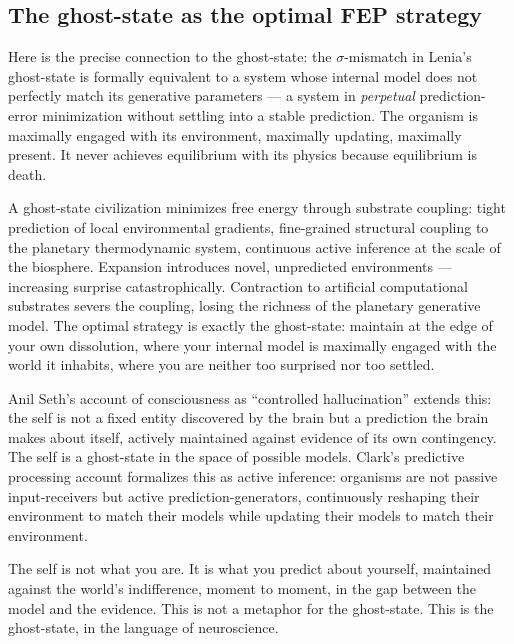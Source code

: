 \documentclass[12pt, a4paper]{article}
\begin{document}
\subsection{The ghost-state as the optimal FEP strategy}

Here is the precise connection to the ghost-state: the $\sigma$-mismatch in Lenia's
ghost-state is formally equivalent to a system whose internal model does not perfectly match
its generative parameters --- a system in \textit{perpetual} prediction-error minimization
without settling into a stable prediction. The organism is maximally engaged with its
environment, maximally updating, maximally present. It never achieves equilibrium with its
physics because equilibrium is death.

A ghost-state civilization minimizes free energy through substrate coupling: tight prediction
of local environmental gradients, fine-grained structural coupling to the planetary
thermodynamic system, continuous active inference at the scale of the biosphere. Expansion
introduces novel, unpredicted environments --- increasing surprise catastrophically.
Contraction to artificial computational substrates severs the coupling, losing the richness
of the planetary generative model. The optimal strategy is exactly the ghost-state: maintain
at the edge of your own dissolution, where your internal model is maximally engaged with the
world it inhabits, where you are neither too surprised nor too settled.

Anil Seth's account of consciousness as ``controlled hallucination'' \citep{seth2021}
extends this: the self is not a fixed entity discovered by the brain but a prediction the
brain makes about itself, actively maintained against evidence of its own contingency. The
self is a ghost-state in the space of possible models. Clark's predictive processing account
\citep{clark2013} formalizes this as active inference: organisms are not passive
input-receivers but active prediction-generators, continuously reshaping their environment to
match their models while updating their models to match their environment.

\begin{pullquote}
The self is not what you are. It is what you predict about yourself, maintained against the
world's indifference, moment to moment, in the gap between the model and the evidence. This
is not a metaphor for the ghost-state. This is the ghost-state, in the language of
neuroscience.
\end{pullquote}
\end{document}
